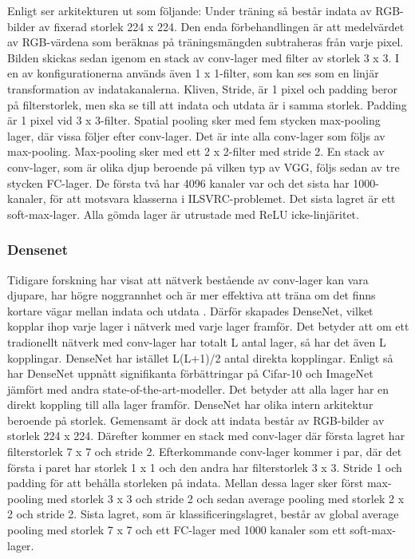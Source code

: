 \documentclass[]{kththesis}
\begin{document}
Enligt \cite{simonyan2014very} ser arkitekturen ut som följande: Under träning så består indata av RGB-bilder av fixerad storlek 224 x 224. Den enda förbehandlingen är att medelvärdet av RGB-värdena som beräknas på träningsmängden subtraheras från varje pixel. Bilden skickas sedan igenom en stack av conv-lager med filter av storlek 3 x 3. I en av konfigurationerna används även 1 x 1-filter, som kan ses som en linjär transformation av indatakanalerna. Kliven, Stride, är 1 pixel och padding beror på filterstorlek, men ska se till att indata och utdata är i samma storlek. Padding är 1 pixel vid 3 x 3-filter. Spatial pooling sker med fem stycken max-pooling lager, där vissa följer efter conv-lager. Det är inte alla conv-lager som följs av max-pooling. Max-pooling sker med ett 2 x 2-filter med stride 2. En stack av conv-lager, som är olika djup beroende på vilken typ av VGG, följs sedan av tre stycken FC-lager. De första två har 4096 kanaler var och det sista har 1000-kanaler, för att motsvara klasserna i ILSVRC-problemet. Det sista lagret är ett soft-max-lager. Alla gömda lager är utrustade med ReLU icke-linjäritet. 

\subsubsection{Densenet}
Tidigare forskning har visat att nätverk bestående av conv-lager kan vara djupare, har högre noggrannhet och är mer effektiva att träna om det finns kortare vägar mellan indata och utdata \parencite{huang2017densely}. Därför skapades DenseNet, vilket kopplar ihop varje lager i nätverk med varje lager framför. Det betyder att om ett tradionellt nätverk med conv-lager har totalt L antal lager, så har det även L kopplingar. DenseNet har istället L(L+1)/2 antal direkta kopplingar. Enligt \cite{huang2017densely} så har DenseNet uppnått signifikanta förbättringar på Cifar-10 och ImageNet jämfört med andra state-of-the-art-modeller. Det betyder att alla lager har en direkt koppling till alla lager framför. DenseNet har olika intern arkitektur beroende på storlek. Gemensamt är dock att indata består av RGB-bilder av storlek 224 x 224. Därefter kommer en stack med conv-lager där första lagret har filterstorlek 7 x 7 och stride 2. Efterkommande conv-lager kommer i par, där det första i paret har storlek 1 x 1 och den andra har filterstorlek 3 x 3. Stride 1 och padding för att behålla storleken på indata. Mellan dessa lager sker först max-pooling med storlek 3 x 3 och stride 2 och sedan average pooling med storlek 2 x 2 och stride 2. Sista lagret, som är klassificeringslagret, består av global average pooling med storlek 7 x 7 och ett FC-lager med 1000 kanaler som ett soft-max-lager.
\end{document}
